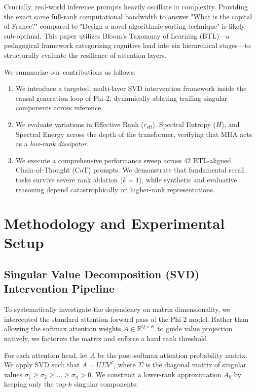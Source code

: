 \documentclass{article}
\begin{document}
Crucially, real-world inference prompts heavily oscillate in complexity. Providing the exact same full-rank computational bandwidth to answer "What is the capital of France?" compared to "Design a novel algorithmic sorting technique" is likely sub-optimal. This paper utilizes Bloom’s Taxonomy of Learning (BTL)—a pedagogical framework categorizing cognitive load into six hierarchical stages—to structurally evaluate the resilience of attention layers.  

We summarize our contributions as follows:
\begin{enumerate}
    \item We introduce a targeted, multi-layer SVD intervention framework inside the causal generation loop of Phi-2, dynamically ablating trailing singular components across inference.
    \item We evaluate variations in Effective Rank ($r_{\text{eff}}$), Spectral Entropy ($H$), and Spectral Energy across the depth of the transformer, verifying that MHA acts as a \textit{low-rank dissipator}.
    \item We execute a comprehensive performance sweep across 42 BTL-aligned Chain-of-Thought (CoT) prompts. We demonstrate that fundamental recall tasks survive severe rank ablation ($k=1$), while synthetic and evaluative reasoning depend catastrophically on higher-rank representations.
\end{enumerate}

\section{Methodology and Experimental Setup}

\subsection{Singular Value Decomposition (SVD) Intervention Pipeline}

To systematically investigate the dependency on matrix dimensionality, we intercepted the standard attention forward pass of the Phi-2 model. Rather than allowing the softmax attention weights $A \in \mathbb{R}^{Q \times K}$ to guide value projection natively, we factorize the matrix and enforce a hard rank threshold. 

For each attention head, let $A$ be the post-softmax attention probability matrix. We apply SVD such that $A = U \Sigma V^T$, where $\Sigma$ is the diagonal matrix of singular values $\sigma_1 \ge \sigma_2 \ge \dots \ge \sigma_n > 0$. We construct a lower-rank approximation $A_k$ by keeping only the top-$k$ singular components:
\end{document}
